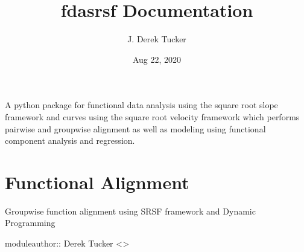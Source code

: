 \documentclass[letterpaper,10pt,english]{sphinxmanual}
\title{fdasrsf Documentation}
\date{Aug 22, 2020}
\author{J. Derek Tucker}
\begin{document}
\pagestyle{empty}
\sphinxmaketitle
\pagestyle{plain}
\sphinxtableofcontents
\pagestyle{normal}
\label{\detokenize{index::doc}}


A python package for functional data analysis using the square root
slope framework and curves using the square root velocity framework
which performs pair\sphinxhyphen{}wise and group\sphinxhyphen{}wise alignment as well as modeling
using functional component analysis and regression.


\chapter{Functional Alignment}
\label{\detokenize{time_warping:module-time_warping}}\label{\detokenize{time_warping:functional-alignment}}\label{\detokenize{time_warping::doc}}
Group\sphinxhyphen{}wise function alignment using SRSF framework and Dynamic Programming

moduleauthor:: Derek Tucker \textless{}\textgreater{}
\end{document}
